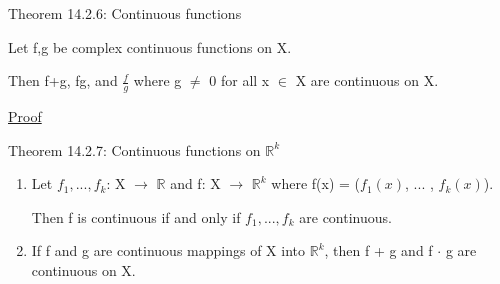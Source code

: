 { \color{red} Theorem 14.2.6: Continuous functions }

    \begin{adjustbox}{minipage=14cm, right, vspace=0.1cm 0cm}
        Let f,g be complex continuous functions on X.

        Then f+g, fg, and $\frac{f}{g}$ where g $\not =$ 0 for all x $\in$ X
        are continuous on X.
    \end{adjustbox}

{ \color{magenta} \underline{Proof} }


    \vspace{0.5cm}

{ \color{red} Theorem 14.2.7: Continuous functions on $\mathbb{R}^k$ }

    \begin{enumerate}[label=(\alph*), leftmargin=1.5cm, itemsep=0.1cm]
        \item Let $f_1,...,f_k$: X $\rightarrow$ $\mathbb{R}$ and
        f: X $\rightarrow$ $\mathbb{R}^k$ where
        f(x) = ($f_1(x)$, ... , $f_k(x)$).

            Then f is continuous if and only if $f_1,...,f_k$ are continuous.

        \item If f and g are continuous mappings of X into $\mathbb{R}^k$,
        then f + g and f $\cdot$ g are continuous on X.
    \end{enumerate}

